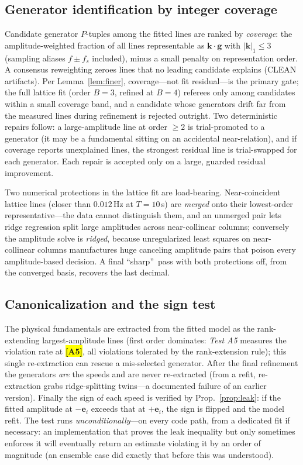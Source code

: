 \documentclass[twocolumn,preprintnumbers,amsmath,amssymb,pra,floatfix]{revtex4-2}
\newcommand{\vect}[1]{\bm{#1}}
\newcommand{\PH}[1]{\colorbox{yellow}{\textbf{\small [#1]}}}
\begin{document}
\subsection{Generator identification by integer coverage}
\label{sec:selection}

Candidate generator $P$-tuples among the fitted lines are ranked by
\emph{coverage}: the amplitude-weighted fraction of all lines
representable as $\vect{k}\cdot\vect{g}$ with $|\vect{k}|_1\le3$
(sampling aliases $f\pm f_s$ included), minus a small penalty on
representation order.  A consensus reweighting zeroes lines that no
leading candidate explains (CLEAN artifacts).  Per
Lemma~\ref{lem:finer}, coverage---not fit residual---is the primary
gate; the full lattice fit (order $B{=}3$, refined at $B{=}4$) referees
only among candidates within a small coverage band, and a candidate
whose generators drift far from the measured lines during refinement is
rejected outright.  Two deterministic repairs follow: a
large-amplitude line at order $\ge2$ is trial-promoted to a generator
(it may be a fundamental sitting on an accidental near-relation), and
if coverage reports unexplained lines, the strongest residual line is
trial-swapped for each generator.  Each repair is accepted only on a
large, guarded residual improvement.

Two numerical protections in the lattice fit are load-bearing.
Near-coincident lattice lines (closer than $0.012$\,Hz at $T=10$\,s)
are \emph{merged} onto their lowest-order representative---the data
cannot distinguish them, and an unmerged pair lets ridge regression
split large amplitudes across near-collinear columns; conversely the
amplitude solve is \emph{ridged}, because unregularized least squares
on near-collinear columns manufactures huge canceling amplitude pairs
that poison every amplitude-based decision.  A final
\textquotedblleft sharp\textquotedblright\ pass with both protections
off, from the converged basis, recovers the last decimal.

\subsection{Canonicalization and the sign test}
\label{sec:canon}

The physical fundamentals are extracted from the fitted model as the
rank-extending largest-amplitude lines (first order dominates:
\emph{Test A5} measures the violation rate at \PH{A5}, all
violations tolerated by the rank-extension rule); this single re-extraction can
rescue a mis-selected generator.  After the final refinement the
generators \emph{are} the speeds and are never re-extracted (from a
refit, re-extraction grabs ridge-splitting twins---a documented failure
of an earlier version).  Finally the sign of each speed is verified by
Prop.~\ref{prop:leak}: if the fitted amplitude at $-\vect{e}_i$
exceeds that at $+\vect{e}_i$, the sign is flipped and the model
refit.  The test runs \emph{unconditionally}---on every code path,
from a dedicated fit if necessary: an implementation that proves the
leak inequality but only sometimes enforces it will eventually return
an estimate violating it by an order of magnitude (an ensemble case
did exactly that before this was understood).
\end{document}
